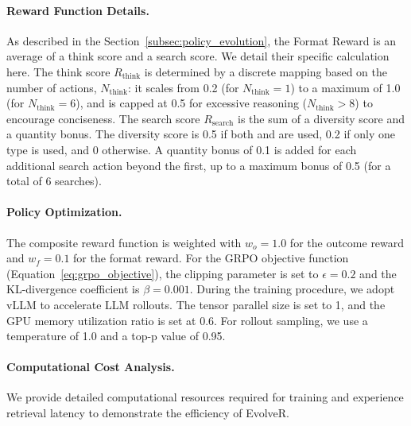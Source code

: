 \paragraph{Reward Function Details.}
As described in the Section~\ref{subsec:policy_evolution}, the Format Reward is an average of a think score and a search score. We detail their specific calculation here. The think score $R_{\text{think}}$ is determined by a discrete mapping based on the number of  actions, $N_{\text{think}}$: it scales from 0.2 (for $N_{\text{think}}=1$) to a maximum of 1.0 (for $N_{\text{think}}=6$), and is capped at 0.5 for excessive reasoning ($N_{\text{think}}>8$) to encourage conciseness. The search score $R_{\text{search}}$ is the sum of a diversity score and a quantity bonus. The diversity score is 0.5 if both  and  are used, 0.2 if only one type is used, and 0 otherwise. A quantity bonus of 0.1 is added for each additional search action beyond the first, up to a maximum bonus of 0.5 (for a total of 6 searches).


\paragraph{Policy Optimization.}
The composite reward function is weighted with $w_o = 1.0$ for the outcome reward and $w_f = 0.1$ for the format reward. For the GRPO objective function (Equation~\ref{eq:grpo_objective}), the clipping parameter is set to $\epsilon = 0.2$ and the KL-divergence coefficient is $\beta = 0.001$. During the training procedure, we adopt vLLM to accelerate LLM rollouts. The tensor
parallel size is set to 1, and the GPU memory utilization ratio is set at 0.6. For rollout sampling, we use a temperature of 1.0 and a top-p value of 0.95.


\paragraph{Computational Cost Analysis.}
We provide detailed computational resources required for training and experience retrieval latency to demonstrate the efficiency of EvolveR.

